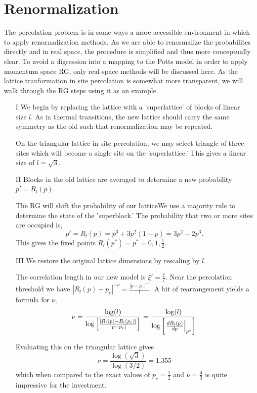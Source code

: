 
\section{Renormalization}

The percolation problem is in some ways a more accessible environment in which to
apply renormalization methods.  As we are able to renormalize the probabilites
directly and in real space, the procedure is simplified and thus more conceptually
clear. To avoid a digression into a mapping to the Potts model in order
to apply momentum space RG, only real-space methods will be discussed here.
 As the lattice tranformation in site percolation is somewhat more
transparent, we will walk through the RG steps using it as an example.
\begin{enumerate}
\item[I] We begin by replacing the lattice with a 'superlattice' of
blocks of linear size $l$.  As in thermal transitions, the new lattice
should carry the same symmetry as the old such that renormalization may
be repeated.

On the triangular lattice in site percolation, we may
select triangle of three sites which will become a single site on the
'superlattice.'  This gives a linear size of $l=\sqrt{3}$.

\item[II] Blocks in the old lattice are averaged to determine a new
probability $p' = R_l(p)$.

The RG will shift the probability of our latticeWe use a majority rule to determine the state of the 'superblock.' The
probability that two or more sites are occupied is,
\[p' = R_l(p) = p^3 + 3p^2(1-p) = 3p^2 - 2p^3.\]
This gives the fixed points $R_l(p^*) = p^* = 0, 1, \frac{1}{2}$.

\item[III] We restore the original lattice dimensions by rescaling by $l$.

The correlation length in our new model is $\xi' = \frac{\xi}{l}$.
Near the percolation threshold we have 
$|R_l(p) - p_c|^{-\nu} = \frac{|p-p_c|^{-\nu}}{l}$.
A bit of rearrangement yields a formula for $\nu$,
\[\nu = \frac{\log(l)}{\log\left[\frac{|R_l(p) - R_l(p_c)|}{|p-p_c|}\right]} =
\frac{\log(l)}{\log\left[\left.\frac{d R_l(p)}{d p}\right|_{p^*}\right]}\]

Evaluating this on the triangular lattice gives
\[\nu = \frac{\log(\sqrt{3})}{\log(3/2)} = 1.355\]
which when compared to the exact values of $p_c = \frac{1}{2}$ and
$\nu = \frac{4}{3}$ is quite impressive for the investment.
\end{enumerate}

